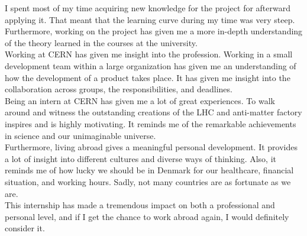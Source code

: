 \noindent I spent most of my time acquiring new knowledge for the project for afterward applying it. That meant that the learning curve during my time was very steep. Furthermore, working on the project has given me a more in-depth understanding of the theory learned in the courses at the university. \\

\noindent Working at CERN has given me insight into the profession. Working in a small development team within a large organization has given me an understanding of how the development of a product takes place. It has given me insight into the collaboration across groups, the responsibilities, and deadlines.\\

\noindent Being an intern at CERN has given me a lot of great experiences. To walk around and witness the outstanding creations of the LHC and anti-matter factory inspires and is highly motivating. It reminds me of the remarkable achievements in science and our unimaginable universe. \\

\noindent Furthermore, living abroad gives a meaningful personal development. It provides a lot of insight into different cultures and diverse ways of thinking. Also, it reminds me of how lucky we should be in Denmark for our healthcare, financial situation, and working hours. Sadly, not many countries are as fortunate as we are. \\

\noindent This internship has made a tremendous impact on both a professional and personal level, and if I get the chance to work abroad again, I would definitely consider it.



















